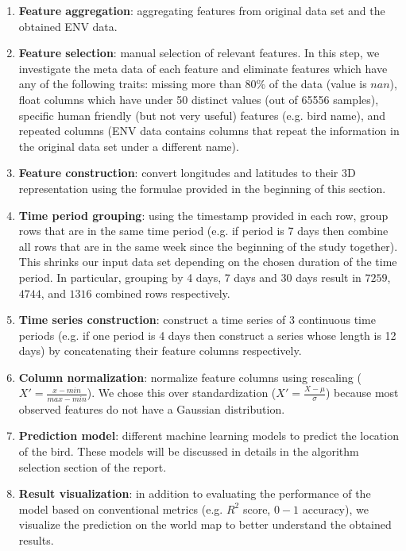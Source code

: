 \documentclass[10pt,conference]{IEEEtran}
\begin{document}
    \begin{enumerate}
        \item \textbf{Feature aggregation}: aggregating features from original data set and the obtained ENV data.
        \item \textbf{Feature selection}: manual selection of relevant features. In this step, we investigate the meta data of each feature and eliminate features which have any of the following traits: missing more than 80\% of the data (value is $nan$), float columns which have under 50 distinct values (out of 65556 samples), specific human friendly (but not very useful) features (e.g. bird name), and repeated columns (ENV data contains columns that repeat the information in the original data set under a different name).
        \item \textbf{Feature construction}: convert longitudes and latitudes to their 3D representation using the formulae provided in the beginning of this section.
        \item \textbf{Time period grouping}: using the timestamp provided in each row, group rows that are in the same time period (e.g. if period is 7 days then combine all rows that are in the same week since the beginning of the study together). This shrinks our input data set depending on the chosen duration of the time period. In particular, grouping by 4 days, 7 days and 30 days result in $7259$, $4744$, and $1316$ combined rows respectively.
        \item \textbf{Time series construction}: construct a time series of 3 continuous time periods (e.g. if one period is 4 days then construct a series whose length is 12 days) by concatenating their feature columns respectively.
        \item \textbf{Column normalization}: normalize feature columns using rescaling ($X' = \frac{x - min}{max - min}$). We chose this over standardization ($X' = \frac{X - \mu}{\sigma}$) because most observed features do not have a Gaussian distribution.
        \item \textbf{Prediction model}: different machine learning models to predict the location of the bird. These models will be discussed in details in the algorithm selection section of the report.
        \item \textbf{Result visualization}: in addition to evaluating the performance of the model based on conventional metrics (e.g. $R^2$ score, $0-1$ accuracy), we visualize the prediction on the world map to better understand the obtained results.
    \end{enumerate}
    
\end{document}
